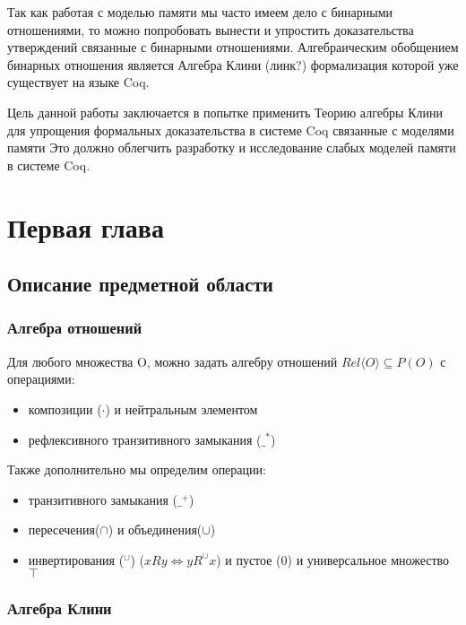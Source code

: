\documentclass[times
              ]{itmo-student-thesis}
\begin{document}
Так как работая с моделью памяти мы часто имеем дело с бинарными отношениями, то можно попробовать вынести и упростить доказательства утверждений связанные с бинарными отношениями. Алгебраическим обобщением бинарных отношения является Алгебра Клини (линк?) формализация которой уже существует на языке Coq.

Цель данной работы заключается в попытке применить Теорию алгебры Клини для упрощения формальных доказательства в системе Coq связанные с моделями памяти Это должно облегчить разработку и исследование слабых моделей памяти в системе Coq.

\chapter{Первая глава}

  \section{Описание предметной области}

    \subsection{Алгебра отношений}
      Для любого множества O, можно задать алгебру отношений $ Rel\langle O \rangle \subseteq P(O) $ с операциями:

      \begin{itemize}
        \item композиции ($ \cdot $) и нейтральным элементом
        \item рефлексивного транзитивного замыкания ($ \_^* $)
      \end{itemize}

      Также дополнительно мы определим операции:

      \begin{itemize}
        \item транзитивного замыкания ($ \_^{+} $)
        \item пересечения($ \cap $) и объединения($ \cup $)
        \item инвертирования ($ ^\cup $) ($ x R y \Leftrightarrow y R^\cup x $)
      и пустое ($0$) и универсальное множество $ \top $
      \end{itemize}

    \subsection{Алгебра Клини}
\end{document}
